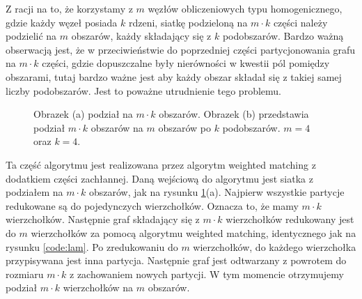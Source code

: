 Z racji na to, że korzystamy z $m$ węzłów obliczeniowych typu homogenicznego, gdzie każdy węzeł posiada $k$ rdzeni,
siatkę podzieloną na $m \cdot k$ części należy podzielić na $m$ obszarów, każdy składający się
z $k$ podobszarów.
Bardzo ważną obserwacją jest, że w przeciwieństwie do poprzedniej części partycjonowania grafu na $m \cdot k$ części,
gdzie dopuszczalne były nierówności w kwestii pól pomiędzy obszarami, tutaj bardzo ważne jest aby każdy obszar składał
się z takiej samej liczby podobszarów.
Jest to poważne utrudnienie tego problemu.

\begin{figure}[h]
\centering
\begin{subfigure}{.5\textwidth}
    \centering
    \caption[short]{}
\end{subfigure}%
\begin{subfigure}{.5\textwidth}
    \centering
    \caption[short]{}
\end{subfigure}
\caption{Obrazek (a) podział na $m \cdot k$ obszarów. Obrazek (b) przedstawia podział $m \cdot k$ obszarów na $m$ obszarów
po $k$ podobszarów. $m=4$ oraz $k=4$.}
\label{im:k_m}
\end{figure}

Ta część algorytmu jest realizowana przez algorytm weighted matching z dodatkiem części zachłannej.
Daną wejściową do algorytmu jest siatka z podziałem na $m \cdot k$ obszarów, jak na rysunku \ref{im:k_m}(a).
Najpierw wszystkie partycje redukowane są do pojedynczych wierzchołków.
Oznacza to, że mamy $m \cdot k$ wierzchołków.
Następnie graf składający się z $m \cdot k$ wierzchołków redukowany jest do $m$ wierzchołków
za pomocą algorytmu weighted matching, identycznego jak na rysunku \ref{code:lam}.
Po zredukowaniu do $m$ wierzchołków, do każdego wierzchołka przypisywana jest inna partycja.
Następnie graf jest odtwarzany z powrotem do rozmiaru $m \cdot k$ z zachowaniem nowych partycji.
W tym momencie otrzymujemy podział $m \cdot k$ wierzchołków na $m$ obszarów.


